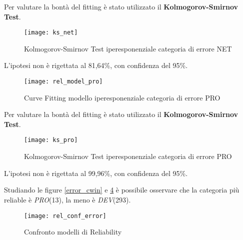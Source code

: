 Per valutare la bontà del fitting è stato utilizzato il \textbf{Kolmogorov-Smirnov Test}.\\

\begin{figure}[!htbp]
  \centering
  \texttt{[image: ks\_net]}
  \caption{Kolmogorov-Smirnov Test iperesponenziale categoria di errore NET}
  \label{ks_net}
\end{figure}

L'ipotesi non è rigettata al 81,64\%, con confidenza del 95\%.\\

\clearpage

\begin{figure}[!htbp]
  \centering
  \texttt{[image: rel\_model\_pro]}
  \caption{Curve Fitting modello iperesponenziale categoria di errore PRO}
  \label{rel_model_pro}
\end{figure}

Per valutare la bontà del fitting è stato utilizzato il \textbf{Kolmogorov-Smirnov Test}.\\

\begin{figure}[!htbp]
  \centering
  \texttt{[image: ks\_pro]}
  \caption{Kolmogorov-Smirnov Test iperesponenziale categoria di errore PRO}
  \label{ks_pro}
\end{figure}

L'ipotesi non è rigettata al 99,96\%, con confidenza del 95\%.\\

\clearpage

Studiando le figure \ref{error_cwin} e \ref{rel_models} è possibile osservare
che la categoria più reliable è \textit{PRO}(13), la meno è \textit{DEV}(293).\\

\begin{figure}[!htbp]
  \centering
  \texttt{[image: rel\_conf\_error]}
  \caption{Confronto modelli di Reliability}
  \label{rel_models}
\end{figure}

\clearpage

